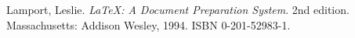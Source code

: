 

\def\bibfont{\hfuzz=2pt}

\printbibliography[heading=bibintoc]


\begin{thebibliography}{99}

  {\sc Lamport,} Leslie.
  \emph{\LaTeX: A Document Preparation System}.
  2nd edition.
  Massachusetts: Addison Wesley, 1994.
  ISBN 0-201-52983-1.

\end{thebibliography}
